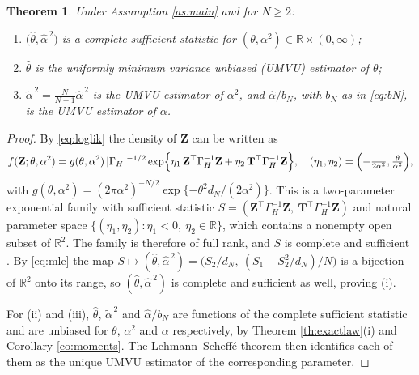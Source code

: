 \documentclass[11pt,reqno]{amsart}
\numberwithin{equation}{section}
\theoremstyle{plain}
\newtheorem{theorem}{Theorem}[section]
\theoremstyle{definition}
\theoremstyle{remark}
\newcommand{\bT}{\mathbf{T}}
\newcommand{\bZ}{\mathbf{Z}}
\newcommand{\GH}{\Gamma_H}
\newcommand{\R}{\mathbb{R}}
\begin{document}
\begin{theorem}\label{th:umvu}
Under Assumption \ref{as:main} and for $N\ge2$:
\begin{enumerate}[label=\textup{(\roman*)}]
\item $\bigl(\widehat\theta,\widehat\alpha^{\,2}\bigr)$ is a complete sufficient
      statistic for $(\theta,\alpha^{2})\in\R\times(0,\infty)$;
\item $\widehat\theta$ is the uniformly minimum variance unbiased (UMVU) estimator of
      $\theta$;
\item $\widetilde\alpha^{\,2}=\frac{N}{N-1}\widehat\alpha^{\,2}$ is the UMVU estimator of
      $\alpha^{2}$, and $\widehat\alpha/b_N$, with $b_N$ as in \eqref{eq:bN}, is the UMVU
      estimator of $\alpha$.
\end{enumerate}
\end{theorem}

\begin{proof}
By \eqref{eq:loglik} the density of $\bZ$ can be written as
\[
  f(\bZ;\theta,\alpha^{2})=g(\theta,\alpha^{2})\,|\GH|^{-1/2}
  \exp\Bigl\{\eta_1\,\bZ^{\top}\GH^{-1}\bZ+\eta_2\,\bT^{\top}\GH^{-1}\bZ\Bigr\},
  \quad
  (\eta_1,\eta_2)=\Bigl(-\tfrac{1}{2\alpha^{2}},\tfrac{\theta}{\alpha^{2}}\Bigr),
\]
with $g(\theta,\alpha^{2})=(2\pi\alpha^{2})^{-N/2}
\exp\{-\theta^{2}d_N/(2\alpha^{2})\}$. This is a two-parameter exponential family with
sufficient statistic $S=(\bZ^{\top}\GH^{-1}\bZ,\ \bT^{\top}\GH^{-1}\bZ)$ and natural
parameter space $\{(\eta_1,\eta_2):\eta_1<0,\ \eta_2\in\R\}$, which contains a nonempty
open subset of $\R^{2}$. The family is therefore of full rank, and $S$ is complete and
sufficient \cite[Thm.~4.3.1 and Ch.~2]{LC98}. By \eqref{eq:mle} the map
$S\mapsto(\widehat\theta,\widehat\alpha^{\,2})
=\bigl(S_2/d_N,\ (S_1-S_2^{2}/d_N)/N\bigr)$ is a bijection of $\R^{2}$ onto its range,
so $(\widehat\theta,\widehat\alpha^{\,2})$ is complete and sufficient as well, proving
(i).

For (ii) and (iii), $\widehat\theta$, $\widetilde\alpha^{\,2}$ and $\widehat\alpha/b_N$
are functions of the complete sufficient statistic and are unbiased for $\theta$,
$\alpha^{2}$ and $\alpha$ respectively, by Theorem \ref{th:exactlaw}(i) and
Corollary \ref{co:moments}. The Lehmann--Scheff\'e theorem
\cite[Thm.~2.1.11]{LC98} then identifies each of them as the unique UMVU estimator of the
corresponding parameter.
\end{proof}
\end{document}
